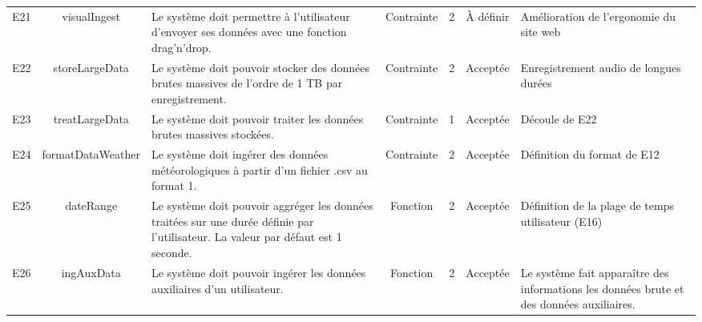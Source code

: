 \documentclass[a4paper]{article}
\begin{document}
\begin{longtable}{|c|c|p{4cm}|c|c|p{2cm}|p{4cm}|}
	E21 & visualIngest      & Le système doit permettre à l’utilisateur d’envoyer ses données avec une fonction drag'n'drop.                                             & Contrainte & 2        & À définir & Amélioration de l’ergonomie du site web                                                                                              \\
	E22 & storeLargeData    & Le système doit pouvoir stocker des données brutes massives de l’ordre de 1 TB par enregistrement.                                         & Contrainte & 2        & Acceptée  & Enregistrement audio de longues durées                                                                                               \\
	E23 & treatLargeData    & Le système doit pouvoir traiter les données brutes massives stockées.                                                                      & Contrainte & 1        & Acceptée  & Découle de E22                                                                                                                       \\
	E24 & formatDataWeather & Le système doit ingérer des données météorologiques à partir d’un fichier .csv au format 1.                                                & Contrainte & 2        & Acceptée  & Définition du format de E12                                                                                                          \\
	E25 & dateRange         & Le système doit pouvoir aggréger les données traitées sur une durée définie par l’utilisateur. La valeur par défaut est 1 seconde.         & Fonction   & 2        & Acceptée  & Définition de la plage de temps utilisateur (E16)                                                                                    \\
	E26 & ingAuxData        & Le système doit pouvoir ingérer les données auxiliaires d’un utilisateur.                                                                  & Fonction   & 2        & Acceptée  & Le système fait apparaître des informations les données brute et des données auxiliaires.                                            \\


	\hline
\end{longtable}
\restoregeometry
\end{document}
